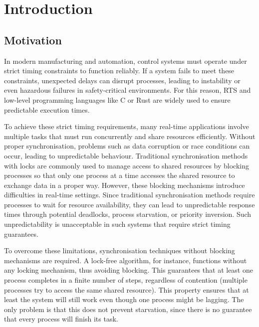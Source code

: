 \chapter{Introduction}\label{ch:introduction}

\section{Motivation}\label{sec:motivation}

In modern manufacturing and automation, control systems must operate under strict timing constraints to function reliably. If a system fails to meet these constraints, unexpected delays can disrupt processes, leading to instability or even hazardous failures in safety-critical environments. For this reason, \ac{RTS} and low-level programming languages like C or Rust are widely used to ensure predictable execution times.

To achieve these strict timing requirements, many real-time applications involve multiple tasks that must run concurrently and share resources efficiently. Without proper synchronisation, problems such as data corruption or race conditions can occur, leading to unpredictable behaviour. Traditional synchronisation methods with locks are commonly used to manage access to shared resources by blocking processes so that only one process at a time accesses the shared resource to exchange data in a proper way. However, these blocking mechanisms introduce difficulties in real-time settings. Since traditional synchronisation methods require processes to wait for resource availability, they can lead to unpredictable response times through potential deadlocks, process starvation, or priority inversion. Such unpredictability is unacceptable in such systems that require strict timing guarantees. \cite{herlihy1991wait, brandenburg2019multiprocessorrealtimelockingprotocols, kode2024analysisSynchronization}

To overcome these limitations, synchronisation techniques without blocking mechanisms are required. A lock-free algorithm, for instance, functions without any locking mechanism, thus avoiding blocking. This guarantees that at least one process completes in a finite number of steps, regardless of contention (multiple processes try to access the same shared resource). This property ensures that at least the system will still work even though one process might be lagging. The only problem is that this does not prevent starvation, since there is no guarantee that every process will finish its task. \cite{kogan2012methodology}

